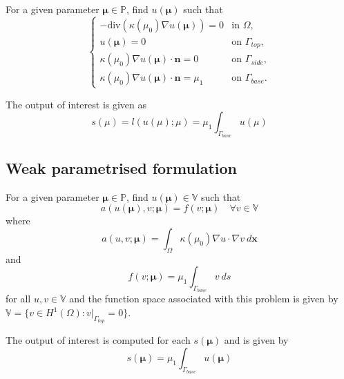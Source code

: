 \documentclass[11pt, oneside]{article}
\begin{document}
For a given parameter $\boldsymbol{\mu}\in\mathbb{P}$, find $u(\boldsymbol{\mu})$ such that
\begin{equation}
\begin{cases}
	- \text{div} (\kappa(\mu_0)\nabla u(\boldsymbol{\mu})) = 0 & \text{in } \Omega,\\
	u(\boldsymbol{\mu}) = 0 & \text{on } \Gamma_{top},\\
	\kappa(\mu_0)\nabla u(\boldsymbol{\mu})\cdot \mathbf{n} = 0 & \text{on } \Gamma_{side},\\
	\kappa(\mu_0)\nabla u(\boldsymbol{\mu})\cdot \mathbf{n} = \mu_1 & \text{on } \Gamma_{base}.
\end{cases}
\end{equation}

The output of interest is given as
\begin{equation}
    s(\mu) = l(u(\mu);\mu) = \mu_1 \int_{\Gamma_{base}}u(\mu)
\end{equation}

\subsection{Weak parametrised formulation}
For a given parameter $\boldsymbol{\mu}\in\mathbb{P}$, find $u(\boldsymbol{\mu})\in\mathbb{V}$ such that
\begin{equation}
a\left(u(\boldsymbol{\mu}),v;\boldsymbol{\mu}\right)=f(v;\boldsymbol{\mu})\quad \forall v\in\mathbb{V}
\end{equation}
where
\begin{equation}
  a(u, v; \boldsymbol{\mu})=\int_{\Omega} \kappa(\mu_0)\nabla u\cdot \nabla v \ d\boldsymbol{x}
\end{equation}
and
\begin{equation}
  f(v; \boldsymbol{\mu})= \mu_1\int_{\Gamma_{base}}v \ ds
\end{equation}
for all $u,v \in \mathbb{V}$ and the function space associated with this problem is given by $\mathbb{V} = \{v\in H^1(\Omega) : v|_{\Gamma_{top}}=0\}$.

The output of interest is computed for each $s(\boldsymbol{\mu})$ and is given by
\begin{equation}
  s(\boldsymbol{\mu}) = \mu_1\int_{\Gamma_{base}} u(\boldsymbol{\mu})
\end{equation}
\end{document}
